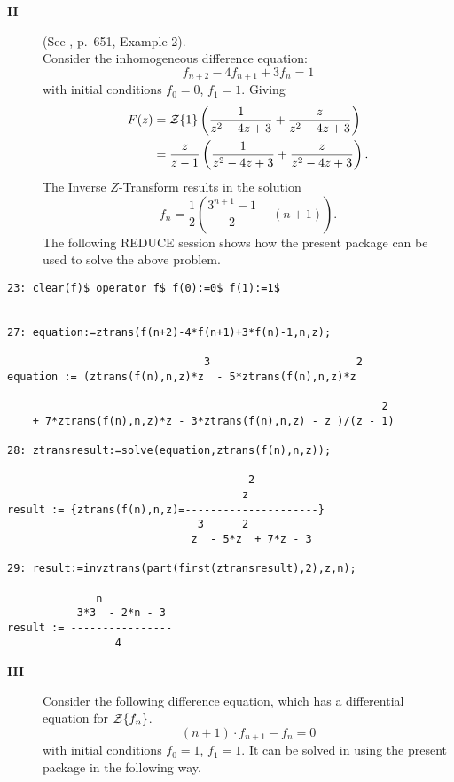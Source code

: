 \begin{description}
\item[{\bf II}] (See \cite{Bronstein:1981}, p.\ 651, Example 2).\\
  Consider the inhomogeneous difference equation:
  \[ f_{n+2} - 4 f_{n+1} + 3 f_{n} = 1 \]
  with initial conditions $f_0=0$, $f_1=1$. Giving
  \begin{align*}
    F(z) &= {\cal Z}\{1\} \left( \frac{1}{z^2-4z+3} +
    \frac{z}{z^2-4z+3} \right) \\
         &= \frac{z}{z-1} \left( \frac{1}{z^2-4z+3} + \frac{z}{z^2-4z+3}
    \right).
  \end{align*}
  The Inverse $Z$-Transform results in the solution
  \[f_n = \frac{1}{2} \left( \frac{3^{n+1}-1}{2}-(n+1) \right).\]
  The following REDUCE session shows how the present package can be
  used to solve the above problem.
\end{description}

\begin{verbatim}
23: clear(f)$ operator f$ f(0):=0$ f(1):=1$


27: equation:=ztrans(f(n+2)-4*f(n+1)+3*f(n)-1,n,z);

                               3                       2
equation := (ztrans(f(n),n,z)*z  - 5*ztrans(f(n),n,z)*z

                                                           2
    + 7*ztrans(f(n),n,z)*z - 3*ztrans(f(n),n,z) - z )/(z - 1)

28: ztransresult:=solve(equation,ztrans(f(n),n,z));

                                      2
                                     z
result := {ztrans(f(n),n,z)=---------------------}
                              3      2
                             z  - 5*z  + 7*z - 3

29: result:=invztrans(part(first(ztransresult),2),z,n);

              n
           3*3  - 2*n - 3
result := ----------------
                 4
\end{verbatim}

\begin{description}
\item[{\bf III}] Consider the following difference equation, which has
  a differential equation for ${\cal Z}\{f_n\}$.
  \[ (n+1) \cdot f_{n+1}-f_n=0\]
  with initial conditions $f_0=1$, $f_1=1$.  It can be solved in
  \REDUCE using the present package in the following way.
\end{description}

